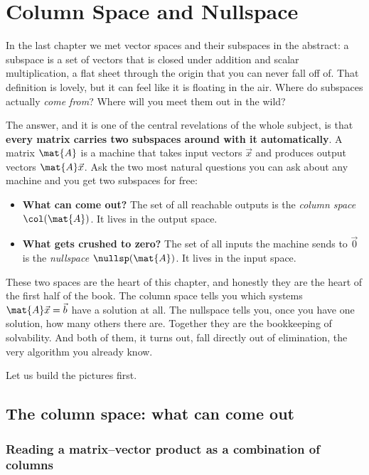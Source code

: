 \chapter{Column Space and Nullspace}

In the last chapter we met vector spaces and their subspaces in the abstract:
a subspace is a set of vectors that is closed under addition and scalar
multiplication, a flat sheet through the origin that you can never fall off of.
That definition is lovely, but it can feel like it is floating in the air. Where
do subspaces actually \emph{come from}? Where will you meet them out in the
wild?

The answer, and it is one of the central revelations of the whole subject, is
that \textbf{every matrix carries two subspaces around with it automatically}.
A matrix $\mat{A}$ is a machine that takes input vectors $\vec{x}$ and produces
output vectors $\mat{A}\vec{x}$. Ask the two most natural questions you can ask
about any machine and you get two subspaces for free:

\begin{itemize}
  \item \textbf{What can come out?} The set of all reachable outputs is the
  \emph{column space} $\col(\mat{A})$. It lives in the output space.
  \item \textbf{What gets crushed to zero?} The set of all inputs the machine
  sends to $\vec{0}$ is the \emph{nullspace} $\nullsp(\mat{A})$. It lives in the
  input space.
\end{itemize}

These two spaces are the heart of this chapter, and honestly they are the heart
of the first half of the book. The column space tells you which systems
$\mat{A}\vec{x} = \vec{b}$ have a solution at all. The nullspace tells you, once
you have one solution, how many others there are. Together they are the
bookkeeping of solvability. And both of them, it turns out, fall directly out of
elimination, the very algorithm you already know.

Let us build the pictures first.

\section{The column space: what can come out}

\subsection{Reading a matrix--vector product as a combination of columns}

